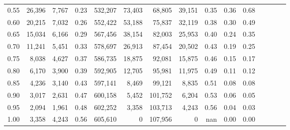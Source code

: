 \begin{tabular}{rrrcrrrrrrrrrrr}
0.55 &  26,396 &  7,767 &                                       0.23 &  532,207 &   73,403 &   68,805 &   39,151 &  0.35 &  0.36 &                         0.68 \\
0.60 &  20,215 &  7,032 &                                       0.26 &  552,422 &   53,188 &   75,837 &   32,119 &  0.38 &  0.30 &                         0.49 \\
0.65 &  15,034 &  6,166 &                                       0.29 &  567,456 &   38,154 &   82,003 &   25,953 &  0.40 &  0.24 &                         0.35 \\
0.70 &  11,241 &  5,451 &                                       0.33 &  578,697 &   26,913 &   87,454 &   20,502 &  0.43 &  0.19 &                         0.25 \\
0.75 &   8,038 &  4,627 &                                       0.37 &  586,735 &   18,875 &   92,081 &   15,875 &  0.46 &  0.15 &                         0.17 \\
0.80 &   6,170 &  3,900 &                                       0.39 &  592,905 &   12,705 &   95,981 &   11,975 &  0.49 &  0.11 &                         0.12 \\
0.85 &   4,236 &  3,140 &                                       0.43 &  597,141 &    8,469 &   99,121 &    8,835 &  0.51 &  0.08 &                         0.08 \\
0.90 &   3,017 &  2,631 &                                       0.47 &  600,158 &    5,452 &  101,752 &    6,204 &  0.53 &  0.06 &                         0.05 \\
0.95 &   2,094 &  1,961 &                                       0.48 &  602,252 &    3,358 &  103,713 &    4,243 &  0.56 &  0.04 &                         0.03 \\
1.00 &   3,358 &  4,243 &                                       0.56 &  605,610 &        0 &  107,956 &        0 &   nan &  0.00 &                         0.00 \\
\bottomrule
\end{tabular}

